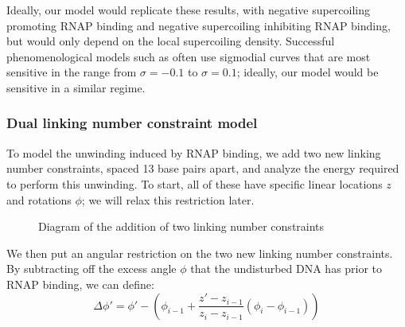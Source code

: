\documentclass[11pt]{article}
\begin{document}
Ideally, our model would replicate these results, with negative supercoiling promoting RNAP binding and negative supercoiling inhibiting RNAP binding, but would only depend on the local supercoiling density. Successful phenomenological models such as \textcite{elhoudaiguiBacterialGenomeArchitecture2019a} often use sigmodial curves that are most sensitive in the range from \(\sigma = -0.1\) to \(\sigma = 0.1\); ideally, our model would be sensitive in a similar regime.

\FloatBarrier
\subsubsection{Dual linking number constraint model}
To model the unwinding induced by RNAP binding, we add two new linking number constraints, spaced 13 base pairs apart, and analyze the energy required to perform this unwinding. To start, all of these have specific linear locations \(z\) and rotations \(\phi\); we will relax this restriction later.

\begin{figure}[h]
    \centering
    \caption{Diagram of the addition of two linking number constraints}
    \label{fig:lnc_diagram}
\end{figure}

We then put an angular restriction on the two new linking number constraints. By subtracting off the excess angle \(\phi\) that the undisturbed DNA has prior to RNAP binding, we can define:
\begin{equation}
    \Delta \phi' = \phi' - \left(\phi_{i - 1} + \frac{z' - z_{i-1}}{z_i - z_{i-1}} (\phi_i - \phi_{i-1})\right)
\end{equation}
\end{document}
